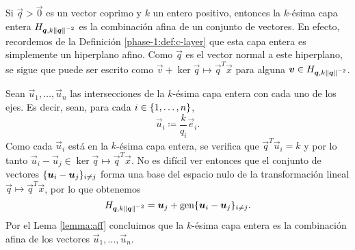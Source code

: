 \begin{example}
	\label{ex:aff}


	Si $\vec{q} > \vec{0}$ es un vector coprimo y $k$ un entero positivo, entonces la $k$-ésima capa
	entera $H_{\boldsymbol{q}, k\left\lVert \boldsymbol{q} \right\rVert^{-2}}$ es la combinación afina de un conjunto de vectores.
	En efecto, recordemos de la Definición \ref{phase-1:def:c-layer} que esta capa entera es
	simplemente un hiperplano afino. Como $\vec{q}$ es el vector normal a este hiperplano, se sigue
	que puede ser escrito como $\vec{v} + \ker{\vec{q} \mapsto \vec{q}^T\vec{x}}$ para alguna
	$\boldsymbol{v} \in H_{\boldsymbol{q}, k\left\lVert \boldsymbol{q} \right\rVert^{-2}}$.

	Sean $\vec{u}_1, \ldots, \vec{u}_n$ las intersecciones de la $k$-ésima capa entera con cada uno
	de los ejes. Es decir, sean, para cada $i \in \lbrace 1, \ldots, n \rbrace$,
	\begin{equation}
		\label{def:u-basis}
		\vec{u}_i \coloneq \frac{k}{q_i}\vec{e}_i.
	\end{equation}
	Como cada $\vec{u}_i$ está en la $k$-ésima capa entera, se verifica que $\vec{q}^T\vec{u}_i = k$
	y por lo tanto $\vec{u}_i - \vec{u}_j \in \ker{\vec{q} \mapsto \vec{q}^T\vec{x}}$. No es difícil
	ver entonces que el conjunto de vectores $\lbrace \boldsymbol{u}_i - \boldsymbol{u}_j \rbrace_{i \neq j}$ forma una
	base del espacio nulo de la transformación lineal $\vec{q} \mapsto \vec{q}^T\vec{x}$, por lo que
	obtenemos
	\begin{equation*}
		H_{\boldsymbol{q}, k\left\lVert \boldsymbol{q} \right\rVert^{-2}} = \boldsymbol{u}_j + \operatorname{gen}\lbrace \boldsymbol{u}_i - \boldsymbol{u}_j \rbrace_{i \neq
		j}.
	\end{equation*}
	Por el Lema \ref{lemma:aff} concluimos que la $k$-ésima capa entera es la combinación
	afina de los vectores $\vec{u}_1, \ldots, \vec{u}_n$.
\end{example}

